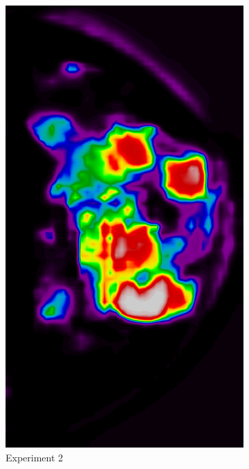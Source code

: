 \begin{figure}[h!]
\begin{subfigure}{0.195\textwidth}
			\includegraphics[width=\textwidth]{plots/examples/example5_probs_2.png}
		\caption{Experiment 2}
    \end{subfigure}
    \begin{subfigure}{0.195\textwidth}
		\centering

\end{subfigure}
\end{figure}
